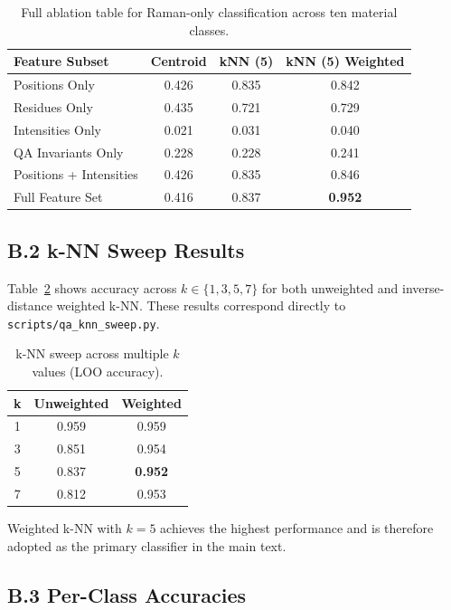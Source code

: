\documentclass[12pt]{article}
\begin{document}
\begin{table}[h!]
\centering
\caption{Full ablation table for Raman-only classification across ten material classes.}
\label{tab:ablationB}
\begin{tabular}{lccc}
\hline
\textbf{Feature Subset}
& \textbf{Centroid} 
& \textbf{kNN (5)} 
& \textbf{kNN (5) Weighted} \\
\hline
Positions Only 
& 0.426 
& 0.835 
& 0.842 \\
Residues Only 
& 0.435 
& 0.721 
& 0.729 \\
Intensities Only 
& 0.021 
& 0.031 
& 0.040 \\
QA Invariants Only 
& 0.228 
& 0.228 
& 0.241 \\
Positions + Intensities 
& 0.426 
& 0.835 
& 0.846 \\
Full Feature Set 
& 0.416 
& 0.837 
& \textbf{0.952} \\
\hline
\end{tabular}
\end{table}

\subsection*{B.2 k-NN Sweep Results}

Table~\ref{tab:knnsweep} shows accuracy across $k \in \{1,3,5,7\}$ for both unweighted and inverse-distance weighted
k-NN. These results correspond directly to {\tt scripts/qa\_knn\_sweep.py}.

\begin{table}[h!]
\centering
\caption{k-NN sweep across multiple $k$ values (LOO accuracy).}
\label{tab:knnsweep}
\begin{tabular}{ccc}
\hline
\textbf{k} 
& \textbf{Unweighted} 
& \textbf{Weighted} \\
\hline
1 & 0.959 & 0.959 \\
3 & 0.851 & 0.954 \\
5 & 0.837 & \textbf{0.952} \\
7 & 0.812 & 0.953 \\
\hline
\end{tabular}
\end{table}

Weighted k-NN with $k=5$ achieves the highest performance and is therefore adopted as the primary classifier
in the main text.

\subsection*{B.3 Per-Class Accuracies}
\end{document}
